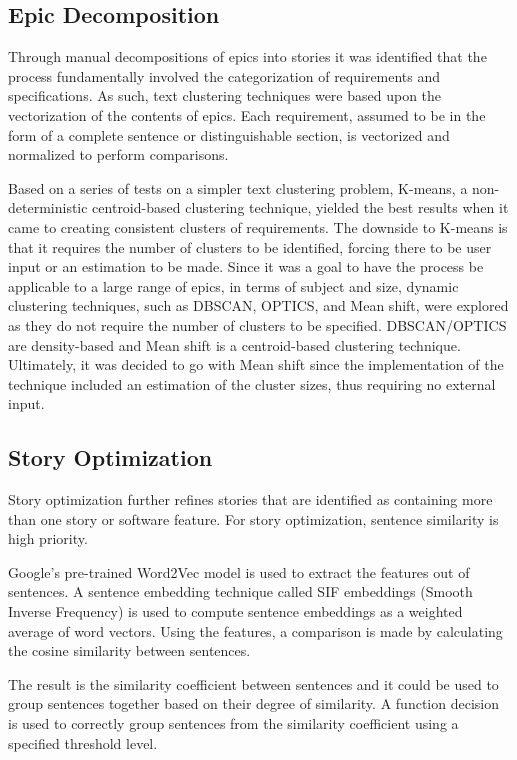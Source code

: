 \subsection{Epic Decomposition}
Through manual decompositions of epics into stories it was identified that the process fundamentally involved the categorization of requirements and specifications. As such, text clustering techniques were based upon the vectorization of the contents of epics. Each requirement, assumed to be in the form of a complete sentence or distinguishable section, is vectorized and normalized to perform comparisons.

Based on a series of tests on a simpler text clustering problem, K-means, a non-deterministic centroid-based clustering technique, yielded the best results when it came to creating consistent clusters of requirements. The downside to K-means is that it requires the number of clusters to be identified, forcing there to be user input or an estimation to be made. Since it was a goal to have the process be applicable to a large range of epics, in terms of subject and size, dynamic clustering techniques, such as DBSCAN, OPTICS, and Mean shift, were explored as they do not require the number of clusters to be specified. DBSCAN/OPTICS are density-based and Mean shift is a centroid-based clustering technique. Ultimately, it was decided to go with Mean shift since the implementation of the technique included an estimation of the cluster sizes, thus requiring no external input.

\subsection{Story Optimization}
Story optimization further refines stories that are identified as containing more than one story or software feature. For story optimization, sentence similarity is high priority. 

Google's pre-trained Word2Vec model\cite{googleword2vec} is used to extract the features out of sentences. A sentence embedding technique called SIF embeddings (Smooth Inverse Frequency) is used to compute sentence embeddings as a weighted average of word vectors. Using the features, a comparison is made by calculating the cosine similarity between sentences. 

The result is the similarity coefficient between sentences and it could be used to group sentences together based on their degree of similarity. A function decision is used to correctly group sentences from the similarity coefficient using a specified threshold level. 

